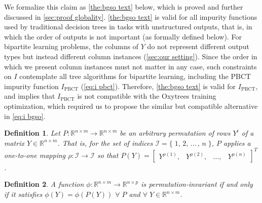 \documentclass[sn-mathphys-num]{sn-jnl}%
\theoremstyle{thmstyleone}%
\theoremstyle{thmstyletwo}%
\theoremstyle{thmstylethree}%
\newtheorem{definition}{Definition}%
\begin{document}
%
\medskip
%
We formalize this claim as \autoref{the:bgso text} below, which is proved and further discussed in \autoref{sec:proof globality}. \autoref{the:bgso text} is valid for all impurity functions used by traditional decision trees in tasks with unstructured outputs, that is, in which the order of outputs is not important (as formally defined below). For bipartite learning problems, the columns of $Y$ do not represent different output types but instead different column instances (\autoref{sec:our setting}). Since the order in which we present column instances must not matter in any case, such constraints on $I$ contemplate all tree algorithms for bipartite learning, including the PBCT impurity function $I_\text{PBCT}$ (\autoref{eq:i pbct}). Therefore, \autoref{the:bgso text} is valid for $I_\text{PBCT}$, and implies that $I_\text{PBCT}$ is not compatible with the Oxytrees training optimization, which required us to propose the similar but compatible alternative in \autoref{eq:i bgso}.
%
%
%
\medskip
%
\begin{definition}
    \label{def:permutation}
Let
$P\colon\mathbb{R}^{n \times m} \to \mathbb{R}^{n \times m}$ be an arbitrary permutation of rows $Y^i$ of a matrix $Y \in \mathbb{R}^{n \times m}$. That is, for the set of indices $\mathcal{I} = \{\;1,\, 2, \,\dots\,,\,n\;\}$, $P$ applies a one-to-one mapping $\rho:\mathcal{I} \to \mathcal{I}$ so that
$
    P(Y) = \begin{bmatrix}
        Y^{\rho(1)}, & Y^{\rho(2)}, & \dots, & Y^{\rho(n)}
    \end{bmatrix}^T
$.
\end{definition}
\begin{definition}
    \label{def:permutation invariance}
    A function
    $\phi\colon\mathbb{R}^{n\times m}\to\mathbb{R}^{n\times p}$
    is \emph{permutation-invariant} if and only if it satisfies $\phi(Y) = \phi(P(Y))$ $\forall\; P$ and $\forall \;Y \in \mathbb{R}^{n\times m}$.
\end{definition}
\end{document}
